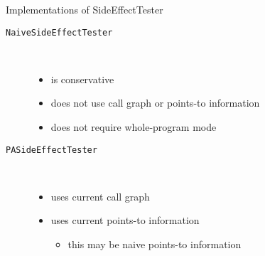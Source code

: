 \begin{slide}{Implementations of SideEffectTester}
\begin{description}
\item [\texttt{NaiveSideEffectTester}]\ \\
\begin{itemize}
\item is conservative
\item does not use call graph or points-to information
\item does not require whole-program mode
\end{itemize}
\item [\texttt{PASideEffectTester}]\ \\
\begin{itemize}
\item uses current call graph
\item uses current points-to information
\begin{itemize}
\item this may be naive points-to information
\end{itemize}
\end{itemize}
\end{description}
\end{slide}

